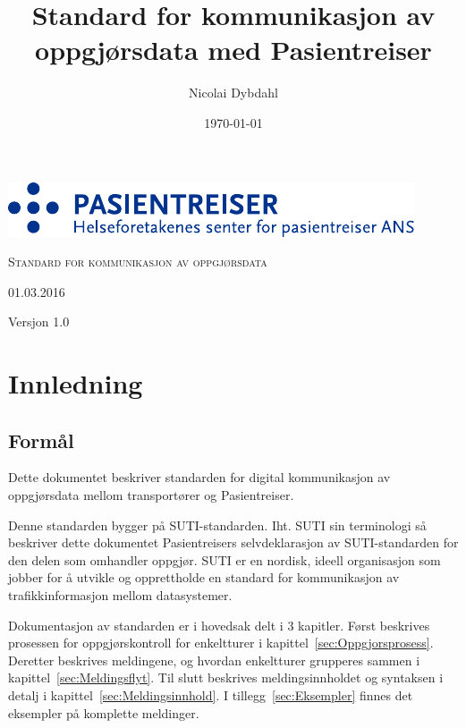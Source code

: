 \documentclass[a4paper,titlepage,norsk,11pt]{article}
\begin{document}

\title{Standard for kommunikasjon av oppgjørsdata med Pasientreiser}

\author{Nicolai Dybdahl}
\renewcommand{\dateseparator}{.}
\date{\ddmmyyyydate \today}

\begin{titlepage}
\vspace*{3cm}
{\centering

  \includegraphics[scale=1.2]{pasientreiser.pdf} \\
  \vspace{5.5cm}
  {\scshape\huge Standard for kommunikasjon av oppgjørsdata\par}
  \vspace{2cm}
  {\large 01.03.2016\par}
  \vspace{1.5cm}
  {\large Versjon 1.0\par}

}

\end{titlepage}

\newpage

\setcounter{tocdepth}{2}

\newpage
\tableofcontents

\newpage
{}

\section{Innledning}

\subsection{Formål}
Dette dokumentet beskriver standarden for digital kommunikasjon av oppgjørsdata mellom transportører og Pasientreiser.

Denne standarden bygger på SUTI-standarden. Iht. SUTI sin terminologi så beskriver dette dokumentet Pasientreisers selvdeklarasjon av SUTI-standarden for den delen som omhandler oppgjør. SUTI  er en nordisk, ideell organisasjon som jobber for å utvikle og opprettholde en standard for kommunikasjon av trafikkinformasjon mellom datasystemer.

Dokumentasjon av standarden er i hovedsak delt i 3 kapitler. Først beskrives prosessen for oppgjørskontroll for enkeltturer i kapittel~\ref{sec:Oppgjorsprosess}. Deretter beskrives meldingene, og hvordan enkeltturer grupperes sammen i kapittel~\ref{sec:Meldingsflyt}. Til slutt beskrives meldingsinnholdet og syntaksen i detalj i kapittel~\ref{sec:Meldingsinnhold}. I tillegg~\ref{sec:Eksempler} finnes det eksempler på komplette meldinger.
\end{document}
